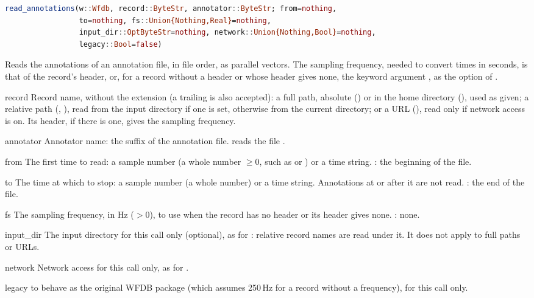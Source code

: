 \begin{lstlisting}[language=Julia,style=signature]
read_annotations(w::Wfdb, record::ByteStr, annotator::ByteStr; from=nothing,
                 to=nothing, fs::Union{Nothing,Real}=nothing,
                 input_dir::OptByteStr=nothing, network::Union{Nothing,Bool}=nothing,
                 legacy::Bool=false)
\end{lstlisting}
Reads the annotations of an annotation file, in file order, as parallel vectors. The
sampling frequency, needed to convert times in seconds, is that of the record's header,
or, for a record without a header or whose header gives none, the keyword argument
, as the option  of .
\begin{params}
\item[record] Record name, without the  extension (a trailing  is
  also accepted): a full path, absolute () or in the home
  directory (), used as given; a relative path
  (, ), read from the input directory if one is set,
  otherwise from the current directory; or a URL
  (), read only if network access is
  on. Its header, if there is one, gives the sampling
  frequency.
\item[annotator] Annotator name: the suffix of the annotation file.  reads the
  file .
\item[from] The first time to read: a sample number (a whole number $\ge 0$, such as
   or ) or a time string. : the beginning of the file.
\item[to] The time at which to stop: a sample number (a whole number) or a time string.
  Annotations at or after it are not read. : the end of the file.
\item[fs] The sampling frequency, in Hz ($> 0$), to use when the record has no header or
  its header gives none. : none.
\item[input\_dir] The input directory for this call only (optional), as for
  : relative record names are read under it. It does not apply to full
  paths or URLs.
\item[network] Network access for this call only, as for .
\item[legacy]  to behave as the original WFDB package (which assumes 250\,Hz
  for a record without a frequency), for this call only.
\end{params}
